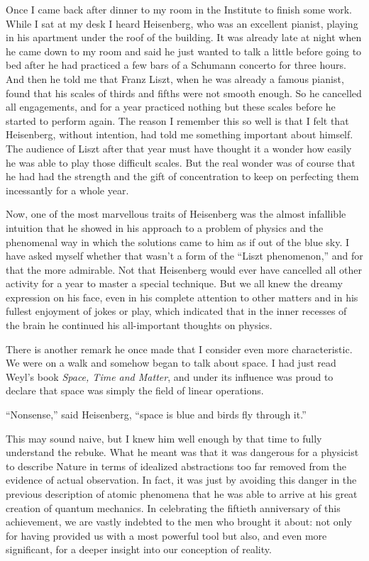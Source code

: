 \documentclass[12pt]{article}
\begin{document}
Once I came back after dinner to my room in the Institute to finish some work. While I sat at my desk I heard Heisenberg, who was an excellent pianist, playing in his apartment under the roof of the
building. It was already late at night when he came down to my room and said he just wanted to talk a little before going to bed after he had practiced a few bars of a Schumann concerto for three hours. And then he told me that Franz Liszt, when he was already a famous pianist, found that his scales of thirds and fifths were not smooth enough. So he cancelled all engagements, and for a year practiced nothing but these scales before he started to perform again. The reason I remember this so well is that I felt that Heisenberg, without intention, had told me something important about himself. The audience of Liszt after that year must have thought it a wonder how easily he was able to play those difficult scales. But the real wonder was of course that he had had the strength and the gift of concentration to keep on perfecting them incessantly for a whole year.

Now, one of the most marvellous traits of Heisenberg was the almost infallible intuition that he showed in his approach to a problem of physics and the phenomenal way in which the solutions came to him as if out of the blue sky. I have asked myself whether that wasn't a form of the ``Liszt phenomenon,'' and for that the more admirable. Not that Heisenberg would ever have cancelled all other activity for a year to master a special technique. But we all knew the dreamy expression on his face, even in his complete attention to other matters and in his fullest enjoyment of jokes or play, which indicated that in the inner recesses of the brain he continued his all-important thoughts on physics.

There is another remark he once made that I consider even more characteristic. We were on a walk and somehow began to talk about space. I had just read Weyl's book {\it Space, Time and Matter}, and under its influence was proud to declare that space was simply the field of linear operations.

``Nonsense,'' said Heisenberg, ``space is blue and birds fly through it.''

This may sound naive, but I knew him well enough by that time to fully understand the rebuke. What he meant was that it was dangerous for a physicist to describe Nature in terms of idealized abstractions too far removed from the evidence of actual observation. In fact, it was just by avoiding this danger in the previous description of atomic phenomena that he was able to arrive at his great creation of quantum mechanics. In celebrating the fiftieth anniversary of this achievement, we are vastly indebted to the men who brought it about: not only for having provided us with a most powerful tool but also, and even more significant, for a deeper insight into our conception of reality.
\end{document}
